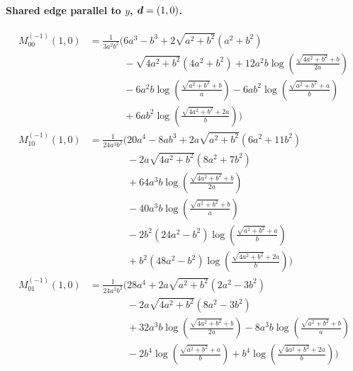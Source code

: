 \paragraph{Shared edge parallel to $y$, $\vb*{d}=(1,0)$.}
\begin{align*}
M^{(-1)}_{00}(1,0) &= \frac{1}{3 a^{2} b^{2}}\Bigg(6 a^{3} - b^{3} + 2 \sqrt{a^{2} + b^{2}}\left(a^{2} + b^{2}\right)\\
&\phantom{{}=\frac{1}{3 a^{2} b^{2}}\Bigg(}- \sqrt{4 a^{2} + b^{2}}\left(4 a^{2} + b^{2}\right) + 12 a^{2} b \log\left(\frac{\sqrt{4 a^{2} + b^{2}} + b}{2 a}\right)\\
&\phantom{{}=\frac{1}{3 a^{2} b^{2}}\Bigg(}- 6 a^{2} b \log\left(\frac{\sqrt{a^{2} + b^{2}} + b}{a}\right) - 6 a b^{2} \log\left(\frac{\sqrt{a^{2} + b^{2}} + a}{b}\right)\\
&\phantom{{}=\frac{1}{3 a^{2} b^{2}}\Bigg(}+ 6 a b^{2} \log\left(\frac{\sqrt{4 a^{2} + b^{2}} + 2 a}{b}\right)\Bigg)\\[1.2ex]
M^{(-1)}_{10}(1,0) &= \frac{1}{24 a^{3} b^{2}}\Bigg(20 a^{4} - 8 a b^{3} + 2 a \sqrt{a^{2} + b^{2}}\left(6 a^{2} + 11 b^{2}\right)\\
&\phantom{{}=\frac{1}{24 a^{3} b^{2}}\Bigg(}- 2 a \sqrt{4 a^{2} + b^{2}}\left(8 a^{2} + 7 b^{2}\right)\\
&\phantom{{}=\frac{1}{24 a^{3} b^{2}}\Bigg(}+ 64 a^{3} b \log\left(\frac{\sqrt{4 a^{2} + b^{2}} + b}{2 a}\right)\\
&\phantom{{}=\frac{1}{24 a^{3} b^{2}}\Bigg(}- 40 a^{3} b \log\left(\frac{\sqrt{a^{2} + b^{2}} + b}{a}\right)\\
&\phantom{{}=\frac{1}{24 a^{3} b^{2}}\Bigg(}- 2 b^{2} \left(24 a^{2} - b^{2}\right) \log\left(\frac{\sqrt{a^{2} + b^{2}} + a}{b}\right)\\
&\phantom{{}=\frac{1}{24 a^{3} b^{2}}\Bigg(}+ b^{2} \left(48 a^{2} - b^{2}\right) \log\left(\frac{\sqrt{4 a^{2} + b^{2}} + 2 a}{b}\right)\Bigg)\\[1.2ex]
M^{(-1)}_{01}(1,0) &= \frac{1}{24 a^{3} b^{2}}\Bigg(28 a^{4} + 2 a \sqrt{a^{2} + b^{2}}\left(2 a^{2} - 3 b^{2}\right)\\
&\phantom{{}=\frac{1}{24 a^{3} b^{2}}\Bigg(}- 2 a \sqrt{4 a^{2} + b^{2}}\left(8 a^{2} - 3 b^{2}\right)\\
&\phantom{{}=\frac{1}{24 a^{3} b^{2}}\Bigg(}+ 32 a^{3} b \log\left(\frac{\sqrt{4 a^{2} + b^{2}} + b}{2 a}\right) - 8 a^{3} b \log\left(\frac{\sqrt{a^{2} + b^{2}} + b}{a}\right)\\
&\phantom{{}=\frac{1}{24 a^{3} b^{2}}\Bigg(}- 2 b^{4} \log\left(\frac{\sqrt{a^{2} + b^{2}} + a}{b}\right) + b^{4} \log\left(\frac{\sqrt{4 a^{2} + b^{2}} + 2 a}{b}\right)\Bigg)\\[1.2ex]

\end{align*}

